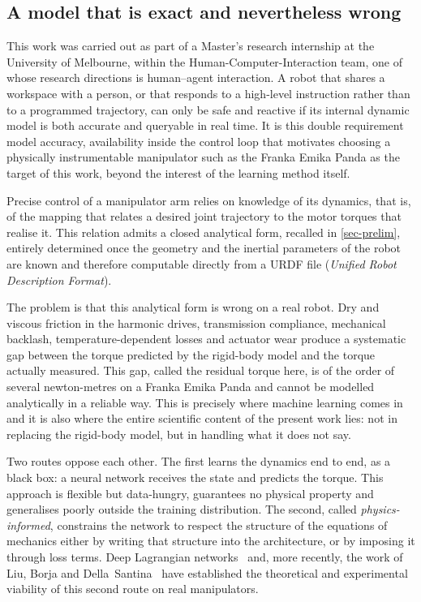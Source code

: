 \documentclass[a4paper, oneside]{article}
\begin{document}
\subsection{A model that is exact and nevertheless wrong}
\label{sec-intro-motivation}

This work was carried out as part of a Master's research internship at the
University of Melbourne, within the Human-Computer-Interaction team,
one of whose research directions is human--agent interaction. A robot that
shares a workspace with a person, or that responds to a high-level instruction
rather than to a programmed trajectory, can only be safe and reactive if its
internal dynamic model is both accurate and queryable in real time. It is this
double requirement  model accuracy, availability inside the control loop 
that motivates choosing a physically instrumentable manipulator such as the
Franka Emika Panda as the target of this work, beyond the interest of the
learning method itself.

Precise control of a manipulator arm relies on knowledge of its dynamics, that
is, of the mapping that relates a desired joint trajectory to the motor torques
that realise it. This relation admits a closed analytical form, recalled in
\cref{sec-prelim}, entirely determined once the geometry and the inertial
parameters of the robot are known and therefore computable directly from a
URDF file (\emph{Unified Robot Description Format}).

The problem is that this analytical form is wrong on a real robot. Dry and
viscous friction in the harmonic drives, transmission compliance, mechanical
backlash, temperature-dependent losses and actuator wear produce a systematic
gap between the torque predicted by the rigid-body model and the torque
actually measured. This gap, called the residual torque here, is of the order
of several newton-metres on a Franka Emika Panda and cannot be modelled
analytically in a reliable way. This is precisely where machine learning comes
in  and it is also where the entire scientific content of the present work
lies: not in replacing the rigid-body model, but in handling what it does not
say.

Two routes oppose each other. The first learns the dynamics end to end, as a
black box: a neural network receives the state and predicts the torque. This
approach is flexible but data-hungry, guarantees no physical property and
generalises poorly outside the training distribution. The second, called
\emph{physics-informed}, constrains the network to respect the structure of the
equations of mechanics  either by writing that structure into the
architecture, or by imposing it through loss terms. Deep Lagrangian
networks~\cite{lutter2019iclr} and, more recently, the work of Liu, Borja and
Della~Santina~\cite{liu2024} have established the theoretical and experimental
viability of this second route on real manipulators.
\end{document}
